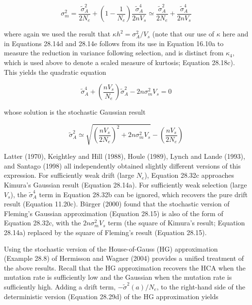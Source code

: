 \documentclass{article}
\begin{document}
\begin{equation}
\sigma_{m}^{2}=\frac{\widetilde{\sigma}_{A}^{2}}{2N_{e}}+\left(1-\frac{1}{N_{e}}\right)\frac{\widetilde{\sigma}_{A}^{4}}{2n V_{s}}\simeq\frac{\widetilde{\sigma}_{A}^{2}}{2N_{e}}+\frac{\widetilde{\sigma}_{A}^{4}}{2n V_{s}}
\tag{28.32a}
\label{eq:28_32a}
\end{equation}

where again we used the result that  $ \kappa h^2 = \sigma_A^2 / V_s $ (note that our use of  $ \kappa $ here and in Equations 28.14d and 28.14e follows from its use in Equation 16.10a to measure the reduction in variance following selection, and is distinct from  $ \kappa_4 $, which is used above to denote a scaled measure of kurtosis; Equation 28.18c). This yields the quadratic equation

\begin{equation}
\widetilde{\sigma}_{A}^{4}+\left(\frac{n V_{s}}{N_{e}}\right)\widetilde{\sigma}_{A}^{2}-2n\sigma_{m}^{2}V_{s}=0
\tag{28.32b}
\label{eq:28_32b}
\end{equation}

whose solution is the stochastic Gaussian result

\begin{equation}
\widetilde{\sigma}_{A}^{2}\simeq\sqrt{\left(\frac{n V_{s}}{2N_{e}}\right)^{2}+2n\sigma_{m}^{2}V_{s}}-\left(\frac{n V_{s}}{2N_{e}}\right)
\tag{28.32c}
\label{eq:28_32c}
\end{equation}

Latter (1970), Keightley and Hill (1988), Houle (1989), Lynch and Lande (1993), and Santago (1998) all independently obtained slightly different versions of this expression. For sufficiently weak drift (large  $ N_e $), Equation 28.32c approaches Kimura's Gaussian result (Equation 28.14a). For sufficiently weak selection (large  $ V_s $), the  $ \widetilde{\sigma}_A^4 $ term in Equation 28.32b can be ignored, which recovers the pure drift result (Equation 11.20c). Bürger (2000) found that the stochastic version of Fleming's Gaussian approximation (Equation 28.15) is also of the form of Equation 28.32c, with the  $ 2n\sigma_m^2 V_s $ term (the square of Kimura's result; Equation 28.14a) replaced by the square of Fleming's result (Equation 28.15).

Using the stochastic version of the House-of-Gauss (HG) approximation (Example 28.8) of Hermisson and Wagner (2004) provides a unified treatment of the above results. Recall that the HG approximation recovers the HCA when the mutation rate is sufficiently low and the Gaussian when the mutation rate is sufficiently high. Adding a drift term,  $ -\tilde{\sigma}^{2}(a)/N_{e} $, to the right-hand side of the deterministic version (Equation 28.29d) of the HG approximation yields
\end{document}
